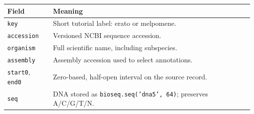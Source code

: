 \begin{tabularx}{\linewidth}{lX}
\toprule
Field & Meaning \\
\midrule
\texttt{key} & Short tutorial label: erato or melpomene. \\
\texttt{accession} & Versioned NCBI sequence accession. \\
\texttt{organism} & Full scientific name, including subspecies. \\
\texttt{assembly} & Assembly accession used to select annotations. \\
\texttt{start0}, \texttt{end0} & Zero-based, half-open interval on the source record. \\
\texttt{seq} & DNA stored as \texttt{bioseq.seq('dna5', 64)}; preserves A/C/G/T/N. \\
\bottomrule
\end{tabularx}
